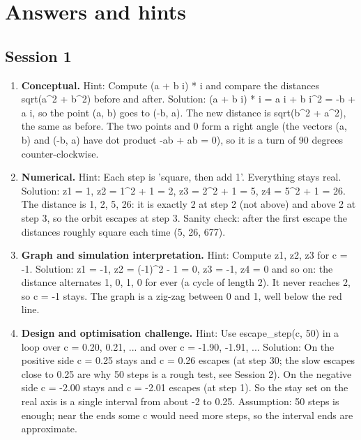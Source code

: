 \documentclass[11pt,a4paper]{article}
\begin{document}
\section{Answers and hints}

\subsection*{Session 1}
\begin{enumerate}[nosep]
\item \textbf{Conceptual.} Hint: Compute (a + b i) * i and compare the distances sqrt(a\textasciicircum{}2 + b\textasciicircum{}2) before and after. Solution: (a + b i) * i = a i + b i\textasciicircum{}2 = -b + a i, so the point (a, b) goes to (-b, a). The new distance is sqrt(b\textasciicircum{}2 + a\textasciicircum{}2), the same as before. The two points and 0 form a right angle (the vectors (a, b) and (-b, a) have dot product -ab + ab = 0), so it is a turn of 90 degrees counter-clockwise.
\item \textbf{Numerical.} Hint: Each step is 'square, then add 1'. Everything stays real. Solution: z1 = 1, z2 = 1\textasciicircum{}2 + 1 = 2, z3 = 2\textasciicircum{}2 + 1 = 5, z4 = 5\textasciicircum{}2 + 1 = 26. The distance is 1, 2, 5, 26: it is exactly 2 at step 2 (not above) and above 2 at step 3, so the orbit escapes at step 3. Sanity check: after the first escape the distances roughly square each time (5, 26, 677).
\item \textbf{Graph and simulation interpretation.} Hint: Compute z1, z2, z3 for c = -1. Solution: z1 = -1, z2 = (-1)\textasciicircum{}2 - 1 = 0, z3 = -1, z4 = 0 and so on: the distance alternates 1, 0, 1, 0 for ever (a cycle of length 2). It never reaches 2, so c = -1 stays. The graph is a zig-zag between 0 and 1, well below the red line.
\item \textbf{Design and optimisation challenge.} Hint: Use escape\_step(c, 50) in a loop over c = 0.20, 0.21, ... and over c = -1.90, -1.91, ... Solution: On the positive side c = 0.25 stays and c = 0.26 escapes (at step 30; the slow escapes close to 0.25 are why 50 steps is a rough test, see Session 2). On the negative side c = -2.00 stays and c = -2.01 escapes (at step 1). So the stay set on the real axis is a single interval from about -2 to 0.25. Assumption: 50 steps is enough; near the ends some c would need more steps, so the interval ends are approximate.
\end{enumerate}
\end{document}
